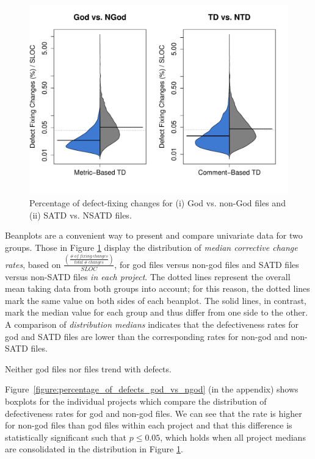 \begin{figure}[h]
	\centering
	\includegraphics[width=140mm]{figures/chapter4/rq1_defectivness_distrubution_new}
	\caption{Percentage of defect-fixing changes for (i) God vs. non-God files and (ii) SATD vs. NSATD files.}
	\label{figure:ch4_number_of_fixing_changes_TD_vs_NTD}
\end{figure}

Beanplots are a convenient way to present and compare univariate data for two groups. Those in Figure \ref{figure:ch4_number_of_fixing_changes_TD_vs_NTD} display the distribution of \textit{median corrective change rates}, based on $\frac{\left (\frac{\#~of~fixing~changes}{total~\#~changes} \right )}{SLOC}$, for god files versus non-god files and SATD files versus non-SATD files \textit{in each project}. %
The dotted lines represent the overall mean taking data from both groups into account; for this reason, the dotted lines mark the same value on both sides of each beanplot. The solid lines, in contrast, mark the median value for each group and thus differ from one side to the other. A comparison of \textit{distribution medians} indicates that the defectiveness rates for god and SATD files are lower than the corresponding rates for non-god and non-SATD files.

\begin{myboxii}
	Neither god files nor \SATD files trend with defects.
\end{myboxii}

Figure~\ref{figure:percentage_of_defects_god_vs_ngod} (in the appendix) shows boxplots for the individual projects which compare the distribution of defectiveness rates for god and non-god files. We can see that the rate is higher for non-god files than god files within each project and that this difference is statistically significant \revision such that $p \le 0.05$, which holds when all project medians are consolidated in the distribution in Figure \ref{figure:ch4_number_of_fixing_changes_TD_vs_NTD}.

